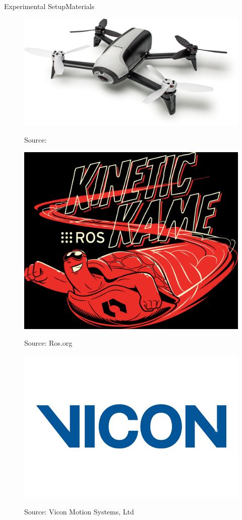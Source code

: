 \begin{frame}{Experimental Setup}{Materials}

\begin {figure}
\begin{minipage}{0.5\textwidth}
	\centering
	\includegraphics[width=3.5 cm,height=2.4 cm]{figuras/new_bebop2_branco2}
	\caption{Source: \cite{SAS}}
\end{minipage}
\begin{minipage}{0.5\textwidth}
	\centering
	\includegraphics[width=3.5 cm,height=2.5 cm]{figuras/kinetic.png}
	\caption{Source: Ros.org }
\end{minipage}%
\begin{minipage}{0.5\textwidth}
	\centering
	\includegraphics[width=3.5 cm,height=2.5 cm]{figuras/vicon}
	\caption{Source: Vicon Motion Systems, Ltd }
\end{minipage}
\end{figure}
\end{frame}

